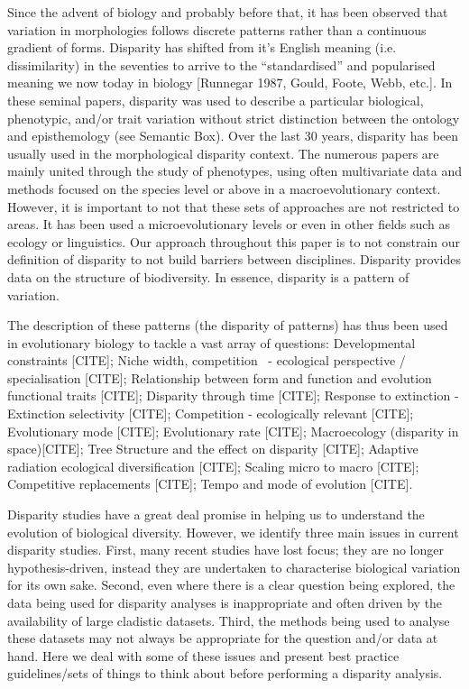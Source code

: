 \documentclass[12pt,letterpaper]{article}
\begin{document}
Since the advent of biology and probably before that, it has been observed that variation in morphologies follows discrete patterns rather than a continuous gradient of forms.
Disparity has shifted from it's English meaning (i.e. dissimilarity) in the seventies to arrive to the ``standardised'' and popularised meaning we now today in biology [Runnegar 1987, Gould, Foote, Webb, etc.].
In these seminal papers, disparity was used to describe a particular biological, phenotypic, and/or trait variation without strict distinction between the ontology and episthemology (see Semantic Box).
Over the last 30 years, disparity has been usually used in the morphological disparity context.
The numerous papers are mainly united through the study of phenotypes, using often multivariate data and methods focused on the species level or above in a macroevolutionary context.
However, it is important to not that these sets of approaches are not restricted to areas.
It has been used a microevolutionary levels or even in other fields such as ecology or linguistics.
Our approach throughout this paper is to not constrain our definition of disparity to not build barriers between disciplines.
Disparity provides data on the structure of biodiversity.
In essence, disparity is a pattern of variation.

The description of these patterns (the disparity of patterns) has thus been used in evolutionary biology to tackle a vast array of questions:
Developmental constraints [CITE]; 
Niche width, competition  - ecological perspective / specialisation [CITE];
Relationship between form and function and evolution functional traits [CITE];
Disparity through time [CITE];
Response to extinction - Extinction selectivity [CITE];
Competition - ecologically relevant [CITE];
Evolutionary mode [CITE];
Evolutionary rate [CITE];
Macroecology (disparity in space)[CITE];
Tree Structure and the effect on disparity [CITE];
Adaptive radiation ecological diversification [CITE];
Scaling micro to macro [CITE];
Competitive replacements [CITE];
Tempo and mode of evolution [CITE].

Disparity studies have a great deal promise in helping us to understand the evolution of biological diversity.
However, we identify three main issues in current disparity studies.
First, many recent studies have lost focus; they are no longer hypothesis-driven, instead they are undertaken to characterise biological variation for its own sake.
Second, even where there is a clear question being explored, the data being used for disparity analyses is inappropriate and often driven by the availability of large cladistic datasets.
Third, the methods being used to analyse these datasets may not always be appropriate for the question and/or data at hand.
Here we deal with some of these issues and present best practice guidelines/sets of things to think about before performing a disparity analysis.
\end{document}
